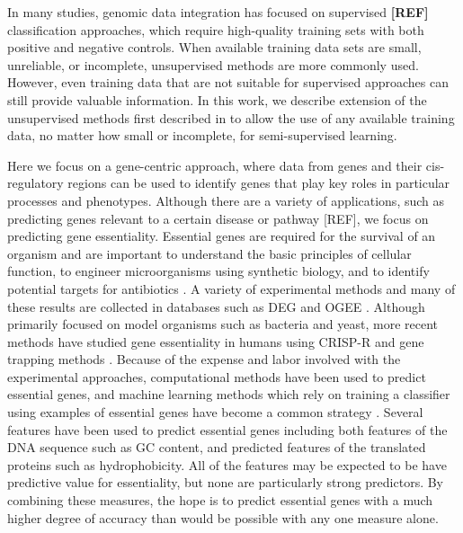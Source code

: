 \documentclass{bmcart}
\begin{document}
In many studies, genomic data integration has focused on supervised \textbf{[REF]} classification approaches, which require 
high-quality training sets with both positive and negative controls.  When available training data sets are small, unreliable, or 
incomplete,  unsupervised methods are more commonly used\citep{Lemmens2006a, Xie2010a, Qin2011a, Hoffman2012a}.  
However, even  training data that are not suitable for supervised approaches can still provide valuable information.  In this work, 
we describe extension of the unsupervised methods first described in \citep{Dvorkin2013a} to allow the use of any available 
training data, no matter how small or incomplete, for semi-supervised learning.

Here we focus on a gene-centric approach,  where data from genes and their cis-regulatory regions can be used to identify 
genes that play key roles in particular processes and phenotypes. Although there are a variety of applications,  such as predicting 
genes relevant to a certain disease or pathway [REF], we focus on  predicting gene essentiality. Essential genes are required for 
the survival of an organism and are important to understand the basic principles of cellular function, to engineer microorganisms 
using synthetic biology, and to identify potential targets for antibiotics \citep{Zhang2015a, Juhas2011a}. A variety of 
experimental methods 
and many of these results are collected in databases such as DEG and OGEE \citep{Lou2014a,Chen2012}.  Although 
primarily focused on model organisms such as bacteria and yeast, more recent methods have studied gene essentiality in 
humans using CRISP-R and gene trapping methods \citep{Wang2015a}. Because of the expense and labor involved with the 
experimental approaches, computational methods have been used to predict essential genes, and machine learning methods 
which rely on training a classifier using examples of essential genes have become a common strategy  \citep{Mobegi2017,Zhang2016a}. 
Several features have been used to predict essential genes including both features of the DNA sequence such as GC content, and predicted 
features of the translated proteins such as hydrophobicity. All of the features may be expected to be 
have predictive value for essentiality, but none are particularly strong predictors. By  combining these measures, the hope is to 
predict essential genes with a much higher degree of accuracy than would be possible  with any one measure alone.
\end{document}
